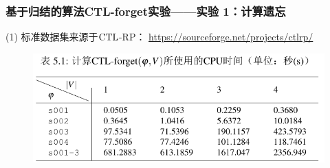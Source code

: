 \documentclass[9pt, CJK]{beamer}
\begin{document}
\begin{frame}
	\frametitle{基于归结的算法CTL-forget实验——{\footnotesize 实验 1：计算遗忘}}
	{\footnotesize
		(1)	标准数据集来源于$\textrm{CTL}$-RP： \url{https://sourceforge.net/projects/ctlrp/}
		\begin{figure}
			\includegraphics[scale=0.35]{figures/expTab}
		\end{figure}

}
\end{frame}
\end{document}
